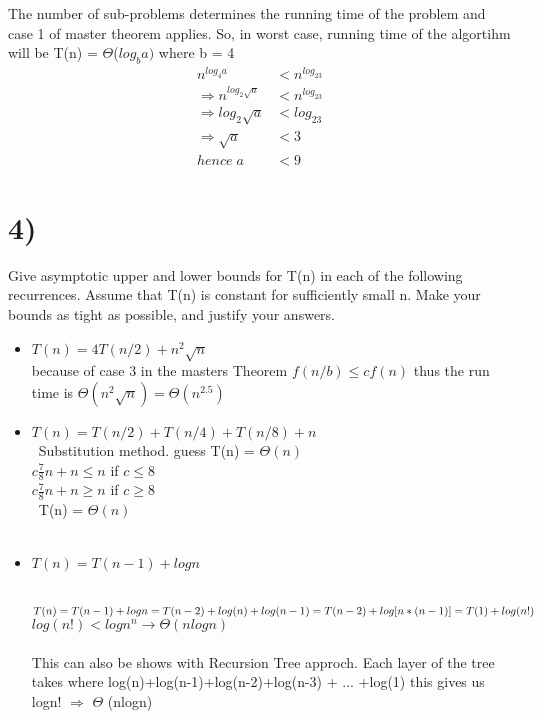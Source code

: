\documentclass[12pt]{article}
\begin{document}
 	 The number of sub-problems determines the running time of the problem and case 1 of master theorem applies. So, in worst case, running time of the algortihm will be T(n)  = $\Theta$($log_ba)$ where b = 4
 	 \begin{align*}
 	 	n^{log_4a} &< n^{log_23} \\
 	 	\Rightarrow n^{log_2\sqrt{a}} &< n^{log_23} \\
 	 	\Rightarrow {log_2\sqrt{a}} &< {log_23} \\
 	 	\Rightarrow \sqrt{a} &< 3\\
 	 	hence \; a &< 9
 	 \end{align*}
 	

\section*{4)}
Give asymptotic upper and lower bounds for T(n) in each of the following recurrences. Assume that T(n) is constant for sufficiently small n. Make your bounds as tight as possible, and justify your answers.
\begin{itemize}
\item
$T(n) = 4T(n/2) + n^2\sqrt{n}$\\

because of case 3 in the masters Theorem $f(n/b)\leq cf(n)$ thus the run time is $\Theta(n^2\sqrt{n}) = \Theta(n^{2.5}) $

\item
$T(n) = T(n/2) + T(n/4) + T(n/8) + n$\\\
Substitution method. guess T(n) = $\Theta(n)$\\
$c \frac{7}{8}n + n\leq n$ if $c \leq 8$\\
$c \frac{7}{8}n + n \geq n $ if $c \geq 8$\\\
T(n) = $\Theta(n)$\\\

\item
$T(n) = T(n-1)+ logn$\\\

$T(n)=T(n-1)+logn = T(n-2)+log(n)+log(n-1)\\
=  T(n-2)+log[n*(n-1)] = T(1)+log(n!)$\\
$log(n!) < logn^n \rightarrow \Theta (nlogn)$\\ 
\\
This can also be shows with Recursion Tree approch. Each layer  of the tree takes where log(n)+log(n-1)+log(n-2)+log(n-3) + ... +log(1) this gives us logn! $\Rightarrow$ 
$\Theta$ (nlogn)
\end{itemize}
\end{document}

